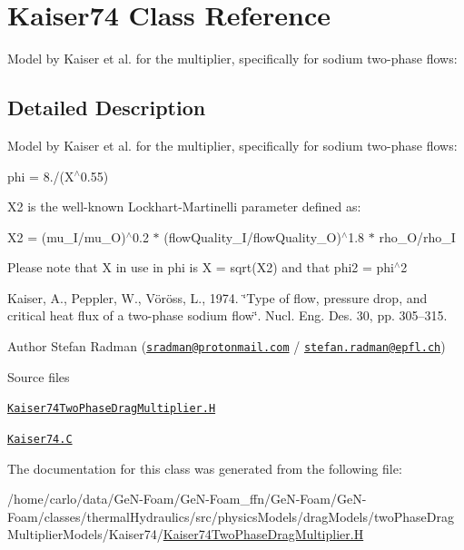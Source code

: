 \hypertarget{classFoam_1_1Kaiser74}{}\section{Kaiser74 Class Reference}
\label{classFoam_1_1Kaiser74}


Model by Kaiser et al. for the multiplier, specifically for sodium two-\/phase flows\+:  




\subsection{Detailed Description}
Model by Kaiser et al. for the multiplier, specifically for sodium two-\/phase flows\+: 

\label{_Description}%
 phi = 8./(X$^\wedge$0.55)

X2 is the well-\/known Lockhart-\/\+Martinelli parameter defined as\+:

X2 = (mu\+\_\+\+I/mu\+\_\+O)$^\wedge$0.2 $\ast$ (flow\+Quality\+\_\+\+I/flow\+Quality\+\_\+O)$^\wedge$1.8 $\ast$ rho\+\_\+\+O/rho\+\_\+I

Please note that X in use in phi is X = sqrt(\+X2) and that phi2 = phi$^\wedge$2

Kaiser, A., Peppler, W., Vöröss, L., 1974. \char`\"{}\+Type of flow, pressure drop, 
and critical heat flux of a two-\/phase sodium flow\char`\"{}. Nucl. Eng. Des. 30, pp. 305–315.

Author Stefan Radman (\href{mailto:sradman@protonmail.com}{\tt sradman@protonmail.\+com} / \href{mailto:stefan.radman@epfl.ch}{\tt stefan.\+radman@epfl.\+ch})

\begin{DoxyParagraph}{Source files}

\begin{DoxyItemize}
\item \href{../../../home/carlo/data/GeN-Foam/GeN-Foam_ffn/GeN-Foam/GeN-Foam/classes/thermalHydraulics/src/physicsModels/dragModels/twoPhaseDragMultiplierModels/Kaiser74/Kaiser74TwoPhaseDragMultiplier.H}{\tt Kaiser74\+Two\+Phase\+Drag\+Multiplier.\+H} 
\item \href{../../../home/carlo/data/GeN-Foam/GeN-Foam_ffn/GeN-Foam/GeN-Foam/classes/thermalHydraulics/src/physicsModels/dragModels/twoPhaseDragMultiplierModels/Kaiser74/Kaiser74.C}{\tt Kaiser74.\+C} 
\end{DoxyItemize}
\end{DoxyParagraph}


The documentation for this class was generated from the following file\+:\begin{DoxyCompactItemize}
\item 
/home/carlo/data/\+Ge\+N-\/\+Foam/\+Ge\+N-\/\+Foam\+\_\+ffn/\+Ge\+N-\/\+Foam/\+Ge\+N-\/\+Foam/classes/thermal\+Hydraulics/src/physics\+Models/drag\+Models/two\+Phase\+Drag\+Multiplier\+Models/\+Kaiser74/\hyperlink{Kaiser74TwoPhaseDragMultiplier_8H}{Kaiser74\+Two\+Phase\+Drag\+Multiplier.\+H}\end{DoxyCompactItemize}
